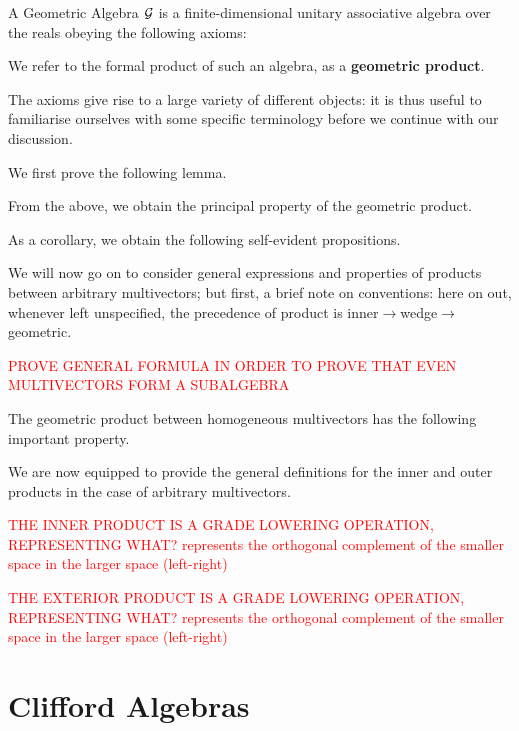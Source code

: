 A Geometric Algebra $\mathcal{G}$  is a finite-dimensional unitary associative algebra over the reals obeying the following axioms:

We refer to the formal product of such an algebra, as a \textbf{geometric product}.

The axioms give rise to a large variety of different objects: it is thus useful to familiarise ourselves with some specific terminology before we continue with our discussion.


We first prove the following lemma.



From the above, we obtain the principal property of the geometric product.



As a corollary, we obtain the following self-evident propositions.



We will now go on to consider general expressions and properties of products between arbitrary multivectors; but first, a brief note on conventions: here on out, whenever left unspecified, the precedence of product is inner$\to$wedge$\to$geometric.

\textcolor{red}{PROVE GENERAL FORMULA IN ORDER TO PROVE THAT EVEN MULTIVECTORS FORM A SUBALGEBRA}

The geometric product between homogeneous multivectors has the following important property.

%




We are now equipped to provide the general definitions for the inner and outer products in the case of arbitrary multivectors.


\textcolor{red}{THE INNER PRODUCT IS A GRADE LOWERING OPERATION, REPRESENTING WHAT? represents the orthogonal complement of the smaller space in the larger space (left-right)}



\textcolor{red}{THE EXTERIOR PRODUCT IS A GRADE LOWERING OPERATION, REPRESENTING WHAT? represents the orthogonal complement of the smaller space in the larger space (left-right)}

\newpage

\section{Clifford Algebras}

